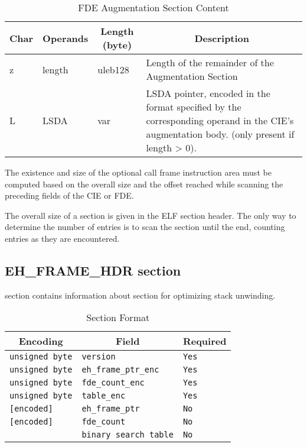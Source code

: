 \begin{table}[H]
\Hrule
\caption{FDE Augmentation Section Content}
\label{format-fdeaug}
\begin{center}
\begin{tabular}{l|p{6em}|l|p{16em}}
  \multicolumn{1}{c}{Char}
         & \multicolumn{1}{c}{Operands}
         & \multicolumn{1}{c}{Length (byte)}
         & \multicolumn{1}{c}{Description} \\ \hline
  z & length & uleb128 & Length of the remainder of the
                                        Augmentation Section \\
  L & LSDA & var & LSDA pointer, encoded in the
                   format specified by the
                   corresponding operand in the CIE's
                   augmentation body. (only present if length > 0). \\
\hline
    \end{tabular}
  \end{center}
\Hrule
\end{table}
The existence and size of the optional call frame instruction area must
be computed
based on the overall size and the offset reached while scanning the
preceding fields of the CIE or FDE.

The overall size of a  section is given in the ELF section
header.  The only way to determine the number of entries is to scan
the section until the end, counting entries as they are encountered.

\subsection{EH\_FRAME\_HDR section}
\label{sec_eh_frame_hdr}

 section contains information about 
section for optimizing stack unwinding.

\begin{table}[H]
\Hrule
 \caption{ Section Format}
 \label{format-eh_frame_hdr}
 \begin{center}
  \begin{tabular}[t]{l|l|l}
   \multicolumn{1}{c}{Encoding}
     & \multicolumn{1}{c}{Field}
       & \multicolumn{1}{c}{Required} \\
   \hline
   \texttt{unsigned byte} & \texttt{version} & \texttt{Yes} \\
   \texttt{unsigned byte} & \texttt{eh_frame_ptr_enc} & \texttt{Yes}\\
   \texttt{unsigned byte} & \texttt{fde_count_enc} & \texttt{Yes} \\
   \texttt{unsigned byte} & \texttt{table_enc} & \texttt{Yes} \\
   \texttt{[encoded]} & \texttt{eh_frame_ptr} & \texttt{No} \\
   \texttt{[encoded]} & \texttt{fde_count} & \texttt{No} \\
    & \texttt{binary search table} & \texttt{No} \\
  \end{tabular}
 \end{center}
\Hrule
\end{table}


